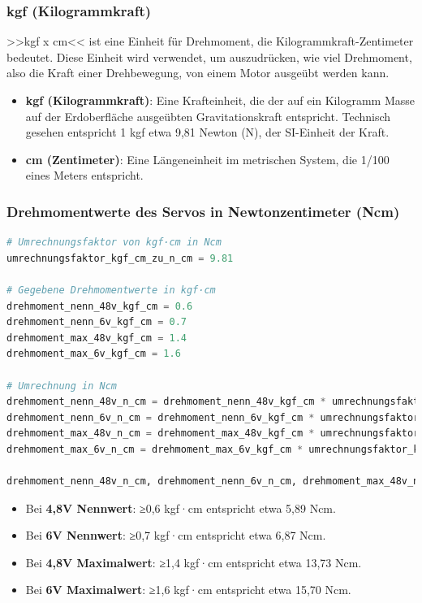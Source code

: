 \documentclass{vorlage-design-main}
\begin{document}
\hypertarget{kgf-kilogrammkraft}{%
\subsubsection{kgf (Kilogrammkraft)}\label{kgf-kilogrammkraft}}

>>kgf x cm<< ist eine Einheit für Drehmoment, die
Kilogrammkraft-Zentimeter bedeutet. Diese Einheit wird verwendet, um
auszudrücken, wie viel Drehmoment, also die Kraft einer Drehbewegung,
von einem Motor ausgeübt werden kann.

\begin{itemize}

\item
  \textbf{kgf (Kilogrammkraft)}: Eine Krafteinheit, die der auf ein
  Kilogramm Masse auf der Erdoberfläche ausgeübten Gravitationskraft
  entspricht. Technisch gesehen entspricht 1 kgf etwa 9,81 Newton (N),
  der SI-Einheit der Kraft.
\item
  \textbf{cm (Zentimeter)}: Eine Längeneinheit im metrischen System, die
  1/100 eines Meters entspricht.
\end{itemize}

\hypertarget{drehmomentwerte-des-servos-in-newtonzentimeter-ncm}{%
\subsubsection{Drehmomentwerte des Servos in Newtonzentimeter
(Ncm)}\label{drehmomentwerte-des-servos-in-newtonzentimeter-ncm}}

\begin{lstlisting}[language=Python]
# Umrechnungsfaktor von kgf·cm in Ncm
umrechnungsfaktor_kgf_cm_zu_n_cm = 9.81

# Gegebene Drehmomentwerte in kgf·cm
drehmoment_nenn_48v_kgf_cm = 0.6
drehmoment_nenn_6v_kgf_cm = 0.7
drehmoment_max_48v_kgf_cm = 1.4
drehmoment_max_6v_kgf_cm = 1.6

# Umrechnung in Ncm
drehmoment_nenn_48v_n_cm = drehmoment_nenn_48v_kgf_cm * umrechnungsfaktor_kgf_cm_zu_n_cm
drehmoment_nenn_6v_n_cm = drehmoment_nenn_6v_kgf_cm * umrechnungsfaktor_kgf_cm_zu_n_cm
drehmoment_max_48v_n_cm = drehmoment_max_48v_kgf_cm * umrechnungsfaktor_kgf_cm_zu_n_cm
drehmoment_max_6v_n_cm = drehmoment_max_6v_kgf_cm * umrechnungsfaktor_kgf_cm_zu_n_cm

drehmoment_nenn_48v_n_cm, drehmoment_nenn_6v_n_cm, drehmoment_max_48v_n_cm, drehmoment_max_6v_n_cm
\end{lstlisting}

\begin{itemize}

\item
  Bei \textbf{4,8V Nennwert}: ≥0,6 kgf·cm entspricht etwa 5,89 Ncm.
\item
  Bei \textbf{6V Nennwert}: ≥0,7 kgf·cm entspricht etwa 6,87 Ncm.
\item
  Bei \textbf{4,8V Maximalwert}: ≥1,4 kgf·cm entspricht etwa 13,73 Ncm.
\item
  Bei \textbf{6V Maximalwert}: ≥1,6 kgf·cm entspricht etwa 15,70 Ncm.
\end{itemize}
\end{document}
